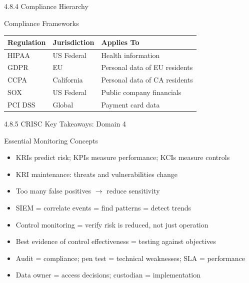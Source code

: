 \documentclass{beamer}
\begin{document}
	\begin{frame}{4.8.4 Compliance Hierarchy}
		\begin{block}{Compliance Frameworks}
			\begin{tabular}{|p{2.5cm}|p{4cm}|p{4.5cm}|}
				\hline
				\textbf{Regulation} & \textbf{Jurisdiction} & \textbf{Applies To} \\
				\hline
				HIPAA & US Federal & Health information \\
				\hline
				GDPR & EU & Personal data of EU residents \\
				\hline
				CCPA & California & Personal data of CA residents \\
				\hline
				SOX & US Federal & Public company financials \\
				\hline
				PCI DSS & Global & Payment card data \\
				\hline
			\end{tabular}
		\end{block}
	\end{frame}
	
	\begin{frame}{4.8.5 CRISC Key Takeaways: Domain 4}
		\begin{block}{Essential Monitoring Concepts}
			\begin{itemize}
				\item KRIs predict risk; KPIs measure performance; KCIs measure controls
				\item KRI maintenance: threats and vulnerabilities change
				\item Too many false positives $\rightarrow$ reduce sensitivity
				\item SIEM = correlate events = find patterns = detect trends
				\item Control monitoring = verify risk is reduced, not just operation
				\item Best evidence of control effectiveness = testing against objectives
				\item Audit = compliance; pen test = technical weaknesses; SLA = performance
				\item Data owner = access decisions; custodian = implementation
			\end{itemize}
		\end{block}
	\end{frame}
	
	
\end{document}
